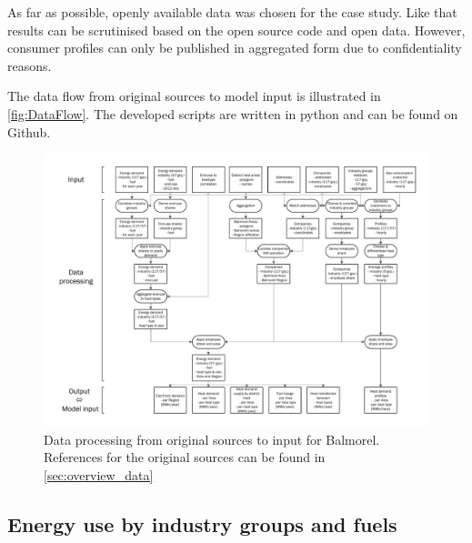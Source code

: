 \documentclass[review]{elsarticle}
\begin{document}
As far as possible, openly available data was chosen for the case study. Like that results can be scrutinised based on the open source code and open data. However, consumer profiles can only be published in aggregated form due to confidentiality reasons.

The data flow from original sources to model input is illustrated in \autoref{fig:DataFlow}. The developed scripts are written in python and can be found on Github.

\begin{figure}[H]
\centering
\includegraphics[width=\linewidth]{Img/DataFlow.pdf}
\caption{Data processing from original sources to input for Balmorel. References for the original sources can be found in \ref{sec:overview_data}}
\label{fig:DataFlow} 
\end{figure}


\subsection{Energy use by industry groups and fuels}
\end{document}
